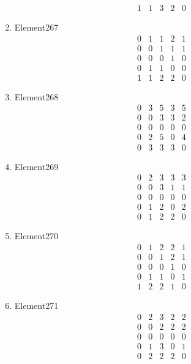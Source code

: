 \documentclass[12pt]{article}
\begin{document}
\begin{multicols}{3}
\begin{enumerate}
\begin{equation*}
\begin{array}{ccccc}
1&1&3&2&0
\end{array}
\end{equation*}
\item Element267
\begin{equation*}
\begin{array}{ccccc}
0&1&1&2&1\\
0&0&1&1&1\\
0&0&0&1&0\\
0&1&1&0&0\\
1&1&2&2&0
\end{array}
\end{equation*}
\item Element268
\begin{equation*}
\begin{array}{ccccc}
0&3&5&3&5\\
0&0&3&3&2\\
0&0&0&0&0\\
0&2&5&0&4\\
0&3&3&3&0
\end{array}
\end{equation*}
\item Element269
\begin{equation*}
\begin{array}{ccccc}
0&2&3&3&3\\
0&0&3&1&1\\
0&0&0&0&0\\
0&1&2&0&2\\
0&1&2&2&0
\end{array}
\end{equation*}
\item Element270
\begin{equation*}
\begin{array}{ccccc}
0&1&2&2&1\\
0&0&1&2&1\\
0&0&0&1&0\\
0&1&1&0&1\\
1&2&2&1&0
\end{array}
\end{equation*}
\item Element271
\begin{equation*}
\begin{array}{ccccc}
0&2&3&2&2\\
0&0&2&2&2\\
0&0&0&0&0\\
0&1&3&0&1\\
0&2&2&2&0
\end{array}
\end{equation*}

\end{enumerate}
\end{multicols}
\end{document}
